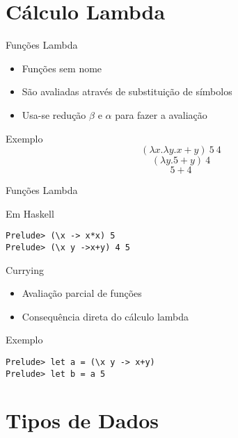 \documentclass{beamer}
\begin{document}
	\section{Cálculo Lambda}
	
		\begin{frame}{}
		\end{frame}

		\begin{frame}{Funções Lambda}
		 
		 \begin{itemize}
		  \item Funções sem nome
		  \item São avaliadas através de substituição de símbolos
		  \item Usa-se redução $\beta$ e $\alpha$ para fazer a avaliação
		 \end{itemize}
		 
		 \begin{block}{Exemplo}
		  \[(\lambda x. \lambda y. x+y)~ 5~ 4\]
		  \[(\lambda y. 5+y)~ 4\]
		  \[5+4\]		  
		 \end{block}		 
		\end{frame}
		
	\begin{frame}[fragile]{Funções Lambda}
	 
	 \begin{block}{Em Haskell}
	  \begin{lstlisting}	
Prelude> (\x -> x*x) 5
Prelude> (\x y ->x+y) 4 5
	  \end{lstlisting}	  
	 \end{block}
	\end{frame}

	\begin{frame}[fragile]{Currying}
		\begin{itemize}
			\item Avaliação parcial de funções
			\item Consequência direta do cálculo lambda
		\end{itemize}
		\begin{block}{Exemplo}
		 \begin{lstlisting}
Prelude> let a = (\x y -> x+y)
Prelude> let b = a 5
		 \end{lstlisting}
		\end{block}
	\end{frame}	
	
	\section{Tipos de Dados}
	
\end{document}
